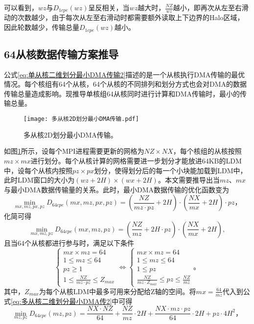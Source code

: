 可以看到，$wz$与$D_{1cpe}(wz)$呈反相关，当$wz$越大时，$\frac{NZ}{wz}$越小，即再次从左至右滑动的次数越少，由于每次从左至右滑动时都需要额外读取上下边界的Halo区域，因此轮数越少，传输总量$D_{1cpe}(wz)$越小。

\subsection{64从核数据传输方案推导}
公式\ref{eq:单从核二维划分最小DMA传输2}描述的是一个从核执行DMA传输的最优情况。每个核组有64个从核，64个从核的不同排列和划分方式也会对DMA的数据传输总量造成影响。现推导单核组64从核同时进行计算和DMA传输时，最小的传输总量。

\begin{figure}[ht]
  \centering
  \texttt{[image: 多从核2D划分最小DMA传输.pdf]}
  \caption{多从核2D划分最小DMA传输。}
  \label{fig:multi-cpe-2d-derive}
\end{figure}

如图\ref{fig:multi-cpe-2d-derive}所示，设每个MPI进程需要更新的网格为$NZ\times NX$，每个核组的从核按照$mz \times mx$进行划分。每个从核计算的网格需要进一步划分才能放进64KB的LDM中，设每个从核内按照$pz\times px$划分，使得划分后的每一个小块能加载到LDM中，此时LDM窗口的大小为$(wz+2H)\times(wx+2H)$。本文需要推导出当$mz$、$mx$与最小DMA数据传输量的关系。此时，最小DMA数据传输的优化函数变为
\begin{equation}
  \min_{mx,mz,px,pz} D_{64cpe}(mx,mz,px,pz) = (\frac{NZ}{mz\cdot pz}+2H)\cdot(\frac{NX}{mx}+2H)\cdot pz，
  \label{eq:多从核二维划分最小DMA传输}
\end{equation}
化简可得
\begin{equation}
  \min_{mx,mz,pz} D_{64cpe}(mx,mz,pz) = (\frac{NZ}{mz}+2H\cdot pz)\cdot(\frac{NX}{mx}+2H),
  \label{eq:多从核二维划分最小DMA传2}
\end{equation}
且当64个从核都进行参与时，满足以下条件
\begin{equation*}
    \left\{\begin{matrix}
mx\times mz=64\\
1\le mz \le 64 \\
pz \ge 1 \\
1 \le \frac{NZ}{mz\cdot pz} \le Z_{max}
\end{matrix}\right.
\Leftrightarrow
  \left\{\begin{matrix}
mx\times mz=64\\
1\le mz \le 64 \\
1 \le pz \\
\frac{NZ}{mz\cdot Z_{max}} \le pz \le \frac{NZ}{mz}
\end{matrix}\right.。
\end{equation*}
其中，$Z_{max}$为每个从核LDM中最多可用来分配给Z轴的空间。将$mx=\frac{64}{mz}$代入到公式\ref{eq:多从核二维划分最小DMA传2}中可得
\begin{equation}
  \min_{mz,pz} D_{64cpe}(mz,pz) = \frac{NX\cdot NZ}{64}+\frac{NZ}{mz}\cdot 2H+\frac{NX\cdot mz \cdot pz}{64} \cdot 2H + pz\cdot 4H^2，
  \label{eq:多从核二维划分最小DMA传3}
\end{equation}

